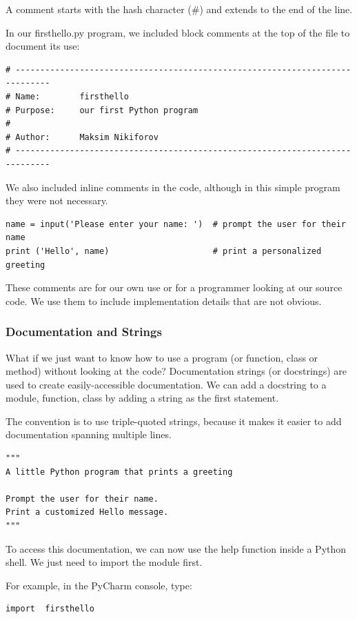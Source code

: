 \documentclass{article}
\begin{document}
A comment starts with  the hash character (\#) and extends to the end of the line.

In our firsthello.py program, we included block comments at the top of the file to document its use:

\begin{lstlisting}
# -----------------------------------------------------------------------------
# Name:        firsthello
# Purpose:     our first Python program
#
# Author:      Maksim Nikiforov
# -----------------------------------------------------------------------------
 \end{lstlisting}
 
We also included inline comments in the code, although in this simple program they were not necessary. 

\begin{lstlisting}
name = input('Please enter your name: ')  # prompt the user for their name
print ('Hello', name)                     # print a personalized greeting
\end{lstlisting}

These comments are for our own use or for a programmer looking at our source code.  We use them to include  implementation details that are not obvious.

\subsubsection{Documentation and Strings}

What if we just want to know how to use a program (or function, class or method) without looking at the code? Documentation strings (or docstrings) are used to create easily-accessible documentation. We can add a docstring to a module, function, class by adding a string as the first statement.  

The convention is to use triple-quoted strings, because it makes it easier to add documentation spanning multiple lines.
\begin{lstlisting}
"""
A little Python program that prints a greeting
 
Prompt the user for their name.
Print a customized Hello message.
"""
\end{lstlisting}

To access this documentation, we can now use the help function inside a Python shell.  We just need to import the module first. 

For example, in the PyCharm console, type:  
\begin{lstlisting}
import  firsthello
\end{lstlisting}
\end{document}

